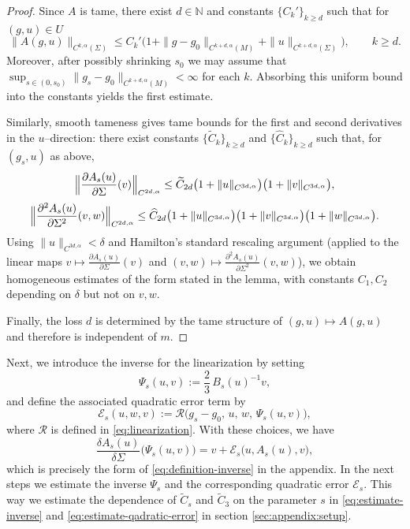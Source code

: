 \documentclass[11pt]{amsart}
\newcommand{\N}{\mathbb{N}}
\newcommand{\del}{\partial}
\begin{document}
\begin{proof}
	Since $A$ is tame, there exist $d\in\N$ and constants $\{C_k'\}_{k\ge d}$ such that for $(g,u)\in U$ 
	\[
	\|A(g,u)\|_{C^{k,\alpha}(\Sigma)}
	\le C_k'\bigl(1+\|g-g_0\|_{C^{k+d,\alpha}(M)}+\|u\|_{C^{k+d,\alpha}(\Sigma)}\bigr),\qquad k\ge d.
	\]
	Moreover, after possibly shrinking $s_0$ we may assume that
	$\sup_{s\in(0,s_0)}\|g_s-g_0\|_{C^{k+d,\alpha}(M)}<\infty$ for each $k$.
	Absorbing this uniform bound into the constants yields the first estimate.
	
	Similarly, smooth tameness gives tame bounds for the first and second derivatives in the $u$--direction:
	there exist constants $\{\widetilde C_k\}_{k\ge d}$ and $\{\widehat C_k\}_{k\ge d}$ such that, for $(g_s,u)$ as above,
	\[
	\Bigl\|\frac{\del A_s(u)}{\del\Sigma}(v)\Bigr\|_{C^{2d,\alpha}}
	\le \widetilde C_{2d}\bigl(1+\|u\|_{C^{3d,\alpha}}\bigr)\bigl(1+\|v\|_{C^{3d,\alpha}}\bigr),
	\]
	\[
	\Bigl\|\frac{\del^2 A_s(u)}{\del\Sigma^2}(v,w)\Bigr\|_{C^{2d,\alpha}}
	\le \widehat C_{2d}\bigl(1+\|u\|_{C^{3d,\alpha}}\bigr)\bigl(1+\|v\|_{C^{3d,\alpha}}\bigr)\bigl(1+\|w\|_{C^{3d,\alpha}}\bigr).
	\]
	Using $\|u\|_{C^{3d,\alpha}}<\delta$ and Hamilton's standard rescaling argument
	\cite[Theorem II.2.1.5]{Hamilton1982} (applied to the linear maps $v\mapsto \frac{\del A_s(u)}{\del\Sigma}(v)$ and
	$(v,w)\mapsto \frac{\del^2 A_s(u)}{\del\Sigma^2}(v,w)$),
	we obtain homogeneous estimates of the form stated in the lemma, with constants $C_1,C_2$ depending on $\delta$ but not on $v,w$.
	
	Finally, the loss $d$ is determined by the tame structure of $(g,u)\mapsto A(g,u)$ and therefore is independent of $m$.
\end{proof}
Next, we introduce the inverse for the linearization by setting
\[
\Psi_{s}(u,v):=\frac{2}{3}\,B_{s}(u)^{-1}v,
\]
and define the associated quadratic error term by
\[
\mathcal{E}_{s}(u,w,v)
:=\mathcal{R}\bigl(g_{s}-g_0,\,u,\,w,\,\Psi_{s}(u,v)\bigr),
\]
where $\mathcal{R}$ is defined in \eqref{eq:linearization}.
With these choices, we have
\[
\frac{\delta A_{s}(u)}{\delta\Sigma}\bigl(\Psi_{s}(u,v)\bigr)
= v+\mathcal{E}_{s}\bigl(u, A_{s}(u), v\bigr),
\]
which is precisely the form of \eqref{eq:definition-inverse} in the appendix.
In the next steps we estimate the inverse $\Psi_s$ and the corresponding quadratic error
$\mathcal{E}_{s}$. This way we estimate the dependence of $\widetilde{C}_s$ and $\widetilde{C}_3$ on the parameter $s$ in \eqref{eq:estimate-inverse} and \eqref{eq:estimate-qadratic-error} in section \ref{sec:appendix:setup}.
\end{document}

